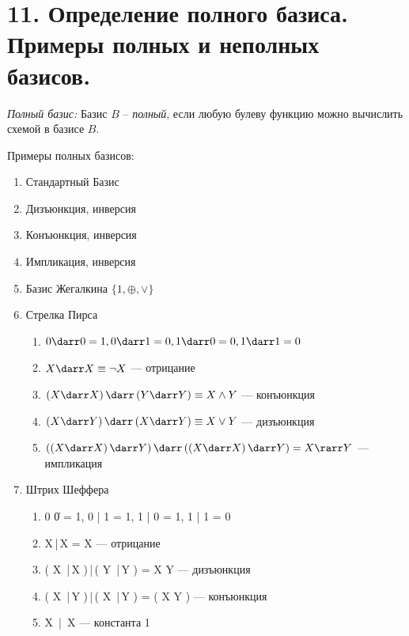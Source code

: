 \documentclass[a4paper, 12pt]{article}
\begin{document}
\section*{11. Определение полного базиса. Примеры полных и неполных базисов.}

\textit{Полный базис: } Базис $B$ -- \textit{полный}, если любую булеву функцию можно вычислить схемой в базисе $B$.
 
Примеры полных базисов:

\begin{enumerate}
    \item Стандартный Базис
    \item Дизъюнкция, инверсия
    \item Конъюнкция, инверсия
    \item Импликация, инверсия
    \item Базис Жегалкина $\lbrace 	1, \oplus, \vee \rbrace$
    \item Стрелка Пирса
    \begin{enumerate}
        \item $0 \darr 0 = 1, 0 \darr 1 = 0, 1 \darr 0 = 0, 1 \darr 1 = 0$
        \item $X \darr X \equiv \neg X$  — отрицание
        \item $\left( {X \darr X} \right) \darr \left( {Y \darr Y } \right) \equiv {X  \wedge Y }$  — конъюнкция
        \item $\left( {X \darr Y} \right) \darr \left( {X \darr Y} \right) \equiv X \vee Y$  — дизъюнкция
        \item $\left( \left( {X \darr X } \right) \darr Y \right) \darr \left( \left( {X \darr X } \right) \darr Y \right) = X \rarr Y$  — импликация
    \end{enumerate}
    \item Штрих Шеффера
    \begin{enumerate}
        \item 0 \| 0 = 1, 0 | 1 = 1, 1 | 0 = 1, 1 | 1 = 0
        \item X\,|\,X  = \neg X  — отрицание
        \item \left( {X \,|\,X } \right)\,|\,\left( {Y \,|\,Y } \right) = X \vee Y  — дизъюнкция
        \item \left( {X \,|\,Y } \right)\,|\,\left( {X \,|\,Y } \right) = \left( {X  \wedge Y } \right)  — конъюнкция
        \item X \,|\, \neg X  — константа 1
    \end{enumerate}
\end{enumerate}
\end{document}
